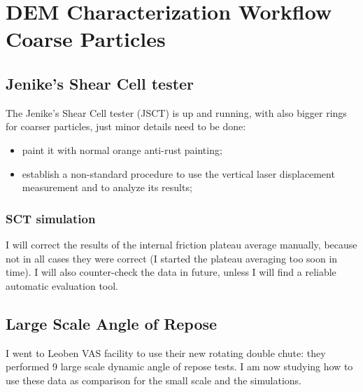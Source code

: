 
\section{DEM Characterization Workflow Coarse Particles}
\label{section:Demcharacterizationworkflowcoarseparticles}

\subsection{Jenike's  Shear Cell tester}
\label{subsection:jenikeshearcell}

The Jenike's  Shear Cell tester (JSCT) is up and running, with also bigger rings for coarser particles, just minor details need to be done:
\begin{itemize}
\item{paint it with normal orange anti-rust painting;}
\item{establish a non-standard procedure to use the vertical laser displacement measurement and to analyze its results;}
\end{itemize}

\subsubsection{SCT simulation}
\label{subsubsection:sctsimulation}

I will correct the results of the internal friction plateau average manually, because not in all cases they were correct (I started the plateau averaging too soon in time).
I will also counter-check the data in future, unless I will find a reliable automatic evaluation tool.\\

\subsection{Large Scale Angle of Repose}
\label{subsection:largescaleaor}

I went to Leoben VAS facility to use their new rotating double chute: they performed 9 large scale dynamic angle of repose tests. I am now studying how to use these data as comparison for the small scale and the simulations.\\

